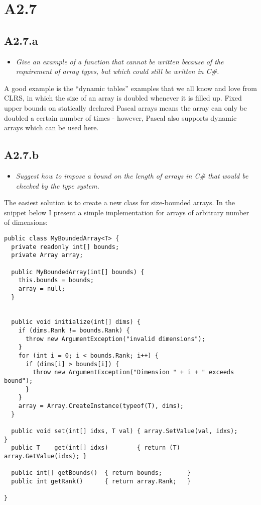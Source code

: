 
\newpage

\section{A2.7}

\subsection{A2.7.a}

\begin{itemize}
  \item \emph{Give an example of a function that cannot be written because of
    the requirement of array types, but which could still be written in C\#.}
\end{itemize}

A good example is the ``dynamic tables'' examples that we all know and love from
CLRS, in which the size of an array is doubled whenever it is filled up. Fixed
upper bounds on statically declared Pascal arrays means the array can only be
doubled a certain number of times - however, Pascal also supports dynamic arrays
which can be used here.

\sectend

\newpage
\subsection{A2.7.b}

\begin{itemize}
  \item \emph{Suggest how to impose a bound on the length of arrays in C\# that
    would be checked by the type system.}
\end{itemize}

The easiest solution is to create a new class for size-bounded arrays. In the
snippet below I present a simple implementation for arrays of arbitrary number
of dimensions:

\begin{verbatim}
public class MyBoundedArray<T> {
  private readonly int[] bounds;
  private Array array;
  
  public MyBoundedArray(int[] bounds) {
    this.bounds = bounds;
    array = null;
  }


  public void initialize(int[] dims) {
    if (dims.Rank != bounds.Rank) {
      throw new ArgumentException("invalid dimensions");
    }
    for (int i = 0; i < bounds.Rank; i++) {
      if (dims[i] > bounds[i]) {
        throw new ArgumentException("Dimension " + i + " exceeds bound");
      }
    }
    array = Array.CreateInstance(typeof(T), dims);
  }
  
  public void set(int[] idxs, T val) { array.SetValue(val, idxs);       }
  public T    get(int[] idxs)        { return (T) array.GetValue(idxs); }

  public int[] getBounds()  { return bounds;       }
  public int getRank()      { return array.Rank;   }

}
\end{verbatim}

